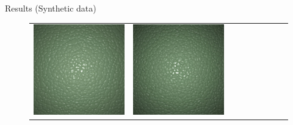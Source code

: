 \documentclass[final]{beamer}
\newlength{\twocolwid}
\newlength{\resultwidth}
\begin{document}
\begin{frame}[t]
\begin{columns}[t]
\begin{column}{\twocolwid}
\begin{block}{Results (Synthetic data)}
\begin{figure}[t]
\begin{tabular}{ccrclcccc}
            		\includegraphics[width=\resultwidth]{images/synth/leather/good1.jpg} &
            		\includegraphics[width=\resultwidth]{images/synth/leather/good2.jpg} &

\end{tabular}
\end{figure}
\end{block}
\end{column}
\end{columns}
\end{frame}
\end{document}
